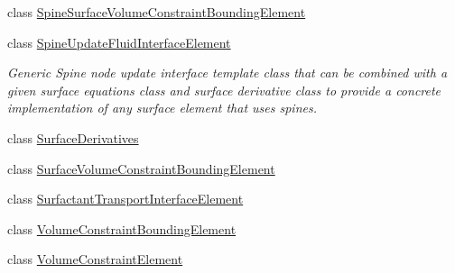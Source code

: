 \begin{DoxyCompactItemize}
class \hyperlink{classoomph_1_1SpineSurfaceVolumeConstraintBoundingElement}{Spine\+Surface\+Volume\+Constraint\+Bounding\+Element}
\item 
class \hyperlink{classoomph_1_1SpineUpdateFluidInterfaceElement}{Spine\+Update\+Fluid\+Interface\+Element}
\begin{DoxyCompactList}\small\item\em Generic Spine node update interface template class that can be combined with a given surface equations class and surface derivative class to provide a concrete implementation of any surface element that uses spines. \end{DoxyCompactList}\item 
class \hyperlink{classoomph_1_1SurfaceDerivatives}{Surface\+Derivatives}
\item 
class \hyperlink{classoomph_1_1SurfaceVolumeConstraintBoundingElement}{Surface\+Volume\+Constraint\+Bounding\+Element}
\item 
class \hyperlink{classoomph_1_1SurfactantTransportInterfaceElement}{Surfactant\+Transport\+Interface\+Element}
\item 
class \hyperlink{classoomph_1_1VolumeConstraintBoundingElement}{Volume\+Constraint\+Bounding\+Element}
\item 
class \hyperlink{classoomph_1_1VolumeConstraintElement}{Volume\+Constraint\+Element}
\end{DoxyCompactItemize}
